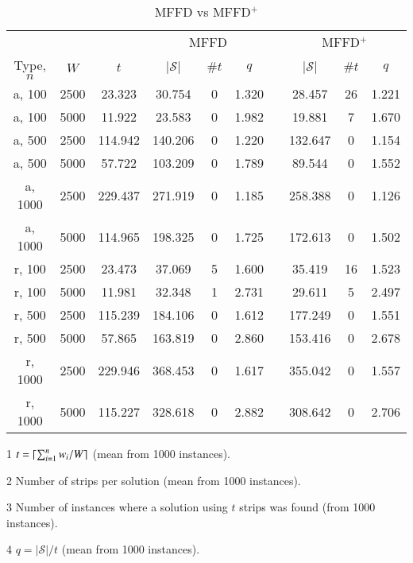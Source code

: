 \documentclass{elsarticle}
\begin{document}
\begin{table}[h!]
\centering
\caption{MFFD vs MFFD$^+$}
\begin{threeparttable}
\begin{tabular}{c@{\hspace{20pt}}c@{\hspace{20pt}}c@{\hspace{20pt}}c@{\hspace{20pt}}c@{\hspace{20pt}}ccc@{\hspace{20pt}}c@{\hspace{20pt}}c@{\hspace{8pt}}}\toprule
	& & & \multicolumn{3}{c}{MFFD} &\phantom{a}& \multicolumn{3}{c}{MFFD$^+$}\\
	\cmidrule{4-6} \cmidrule{8-10}
	Type, $n$ & $W$ & $t$\tnote{1} & $|\mathcal{S}|$\tnote{2} & $\# t$\tnote{3} & $q$\tnote{4} && $|\mathcal{S}|$ & $\# t$ & $q$\\ \midrule	
	a, 100 & 2500 & 23.323 & 30.754 & 0 & 1.320 && 28.457 & 26 & 1.221 \\
	a, 100 & 5000 & 11.922 & 23.583 & 0 & 1.982 && 19.881 & 7 & 1.670  \\
	\midrule
	a, 500 & 2500 & 114.942 & 140.206 & 0 & 1.220 && 132.647 & 0 & 1.154 \\
	a, 500 & 5000 & 57.722 & 103.209 & 0 & 1.789 && 89.544 & 0 & 1.552 \\
	\midrule
	a, 1000 & 2500 & 229.437 & 271.919 & 0 & 1.185 && 258.388 & 0 & 1.126 \\
	a, 1000 & 5000 & 114.965 & 198.325 & 0 & 1.725 && 172.613 & 0 & 1.502 \\
	\midrule
	\midrule
	r, 100 & 2500 & 23.473 & 37.069 & 5 & 1.600 && 35.419 & 16 & 1.523 \\
	r, 100 & 5000 & 11.981 & 32.348 & 1 & 2.731 && 29.611 & 5 & 2.497 \\
	\midrule
	r, 500 & 2500 & 115.239 & 184.106 & 0 & 1.612 && 177.249 & 0 & 1.551 \\
	r, 500 & 5000 & 57.865 & 163.819 & 0 & 2.860 && 153.416 & 0 & 2.678 \\
	\midrule
	r, 1000 & 2500 & 229.946 & 368.453 & 0 & 1.617 && 355.042 & 0 & 1.557 \\
	r, 1000 & 5000 & 115.227 & 328.618 & 0 & 2.882 && 308.642 & 0 & 2.706 \\
	\bottomrule
\end{tabular}
\vspace{0.2cm} %
\begin{tablenotes}
	\item[1] $t = \lceil\sum_{i=1}^{n} w_i / W\rceil$ (mean from 1000 instances).
	\item[2] Number of strips per solution (mean from 1000 instances).
	\item[3] Number of instances where a solution using $t$ strips was found (from 1000 instances).
	\item[4] $q = |\mathcal{S}| /t$ (mean from 1000 instances).
\end{tablenotes}	
\end{threeparttable}	
\label{table:heuristics}
\end{table}
\end{document}
